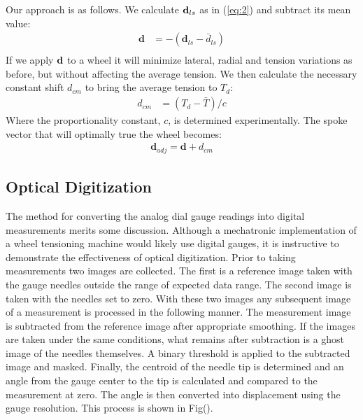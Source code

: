 \documentclass[journal]{IEEEtran}
\begin{document}
Our approach is as follows.  We calculate ${\bf d}_{ls}$ as in (\ref{eq:2}) and subtract its mean value:
\begin{align*}
    \mathbf{d} &= -(\mathbf{d}_{ls} - \bar d_{ls})\\
\end{align*}
If we apply $\bf d$ to a wheel it will minimize lateral, radial and tension variations as before, but without affecting the average tension.  We then calculate the necessary constant shift $d_{cm}$ to bring the average tension to $T_d$:
\begin{align*}
    d_{cm} &=  (T_d - \bar T)/c
\end{align*}
Where the proportionality constant, $c$, is determined experimentally. The spoke vector that will optimally true the wheel becomes:
\begin{align}
    \mathbf{d}_{adj} =\mathbf{d}  + d_{cm} 
\end{align}

\subsection{Optical Digitization}
The method for converting the analog dial gauge readings into digital measurements merits some discussion.  Although a mechatronic implementation of a wheel tensioning machine would likely use digital gauges, it is instructive to demonstrate the effectiveness of optical digitization.  Prior to taking measurements two  images are collected.  The first is a reference image taken with the gauge needles outside the range of expected data range.  The second image is taken with the needles set to zero.  With these two images any subsequent image of a measurement is processed in the following manner.  The measurement image is subtracted from the reference image after appropriate smoothing.  If the images are taken under the same conditions, what remains after subtraction is a ghost image of the needles themselves. A binary threshold is applied to the subtracted image and masked.  Finally, the centroid of the needle tip is determined and an angle from the gauge center to the tip is calculated and compared to the measurement at zero.  The angle is then converted into displacement using the gauge resolution. This process is shown in Fig().  
\end{document}
